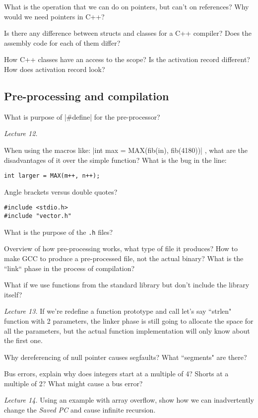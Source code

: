 What is the operation that we can do on pointers, but can't on references? Why
would we need pointers in C++?

Is there any difference between structs and classes for a C++ compiler? Does
the assembly code for each of them differ?

How C++ classes have an access to the scope? Is the activation record
different? How does activation record look?

\subsection{Pre-processing and compilation}%
\label{sub:pre_processing_and_compilation}

What is purpose of |#define| for the pre-processor?

\textit{Lecture 12.}

When using the macros like: |int max = MAX(fib(in), fib(4180))| , what are the
disadvantages of it over the simple function? What is the bug in the line:
\begin{lstlisting}
int larger = MAX(m++, n++);
\end{lstlisting}

Angle brackets versus double quotes?
\begin{lstlisting}
#include <stdio.h>
#include "vector.h"
\end{lstlisting}

What is the purpose of the \verb!.h! files?

Overview of how pre-processing works, what type of file it produces? How to
make GCC to produce a pre-processed file, not the actual binary?  What is the
``link`` phase in the process of compilation?

What if we use functions from the standard library but don't include the
library itself?


\textit{Lecture 13.}
If we're redefine a function prototype and call let's say ``strlen" function
with 2 parameters, the linker phase is still going to allocate the space for
all the parameters, but the actual function implementation will only know about
the first one.

Why dereferencing of null pointer causes segfaults? What ``segments" are there?

Bus errors, explain why does integers start at a multiple of 4? Shorts at a
multiple of 2? What might cause a bus error?

\textit{Lecture 14.}
Using an example with array overflow, show how we can inadvertently change the
\textit{Saved PC} and cause infinite recursion.

